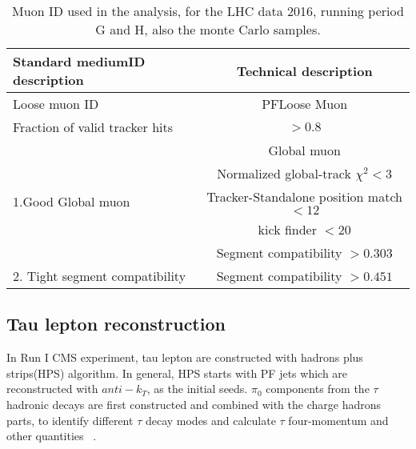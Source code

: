 \begin{table}[!tpb]
\caption{Muon ID used in the analysis, for the LHC data 2016, running period G and H, also the monte Carlo samples.  \label{tbl:standardMedID}}
\label{tab:antil}
\begin{center}
\begin{tabular}{|l|c|}   
\hline
Standard mediumID description                    &  Technical description\\\hline
Loose muon ID                               & PFLoose Muon\\\hline
Fraction of valid tracker hits           & $>0.8$ \\\hline
\multirow{5}{*}{1.Good Global muon}                      &Global muon\\\cline{2-2}
                                                                        &Normalized global-track $\chi^{2}<3$\\\cline{2-2}
                                                                        &Tracker-Standalone position match $< 12$\\\cline{2-2}
                                                                        &kick finder $< 20$ \\\cline{2-2}
                                                                        &Segment compatibility $> 0.303$ \\\hline                                                                       
\hline
2. Tight segment compatibility      & Segment compatibility $>0.451$\\\hline
\end{tabular}
\end{center}
\end{table}

\subsection{Tau lepton reconstruction} \label{Chapter:taureco}

In Run I CMS experiment, tau lepton are constructed with hadrons plus strips(HPS) algorithm. In general, HPS starts with PF jets which are reconstructed with $anti-k_{T}$, as the initial seeds. $\pi_{0}$ components from the $\tau$ hadronic decays are first constructed and combined with the charge hadrons parts, to identify different $\tau$ decay modes and calculate $\tau$ four-momentum and other quantities ~\cite{TauIdentiRunI}. 

